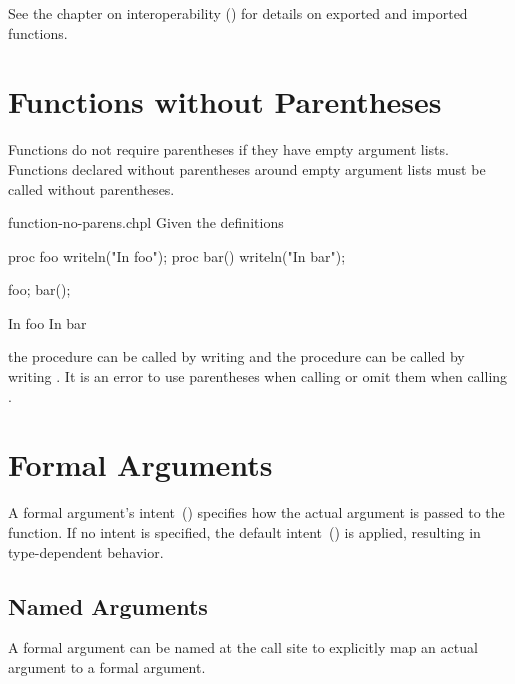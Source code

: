 See the chapter on interoperability ()
for details on exported and imported functions.

\section{Functions without Parentheses}
\label{Functions_without_Parentheses}

Functions do not require parentheses if they have empty argument
lists.  Functions declared without parentheses around empty argument
lists must be called without parentheses.

\begin{chapelexample}{function-no-parens.chpl}
Given the definitions
\begin{chapel}
proc foo { writeln("In foo"); }
proc bar() { writeln("In bar"); }
\end{chapel}
\begin{chapelpost}
foo;
bar();
\end{chapelpost}
\begin{chapeloutput}
In foo
In bar
\end{chapeloutput}
the procedure  can be called by writing  and the
procedure  can be called by writing .  It is an
error to use parentheses when calling  or omit them
when calling .
\end{chapelexample}


\section{Formal Arguments}
\label{Formal_Arguments}

A formal argument's intent~() specifies how the
actual argument is passed to the function.  If no intent is specified,
the default intent~() is applied, resulting in
type-dependent behavior.

\subsection{Named Arguments}
\label{Named_Arguments}

A formal argument can be named at the call site to explicitly map an
actual argument to a formal argument.

